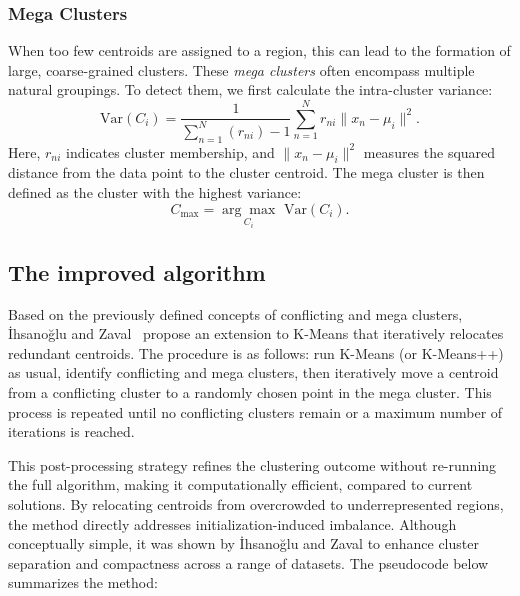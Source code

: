 \documentclass[10pt,twocolumn,letterpaper]{article}
\begin{document}
\subsubsection{Mega Clusters}

When too few centroids are assigned to a region, this can lead to the formation
of large, coarse-grained clusters. These \textit{mega clusters} often encompass
multiple natural groupings. To detect them, we first calculate the
intra-cluster variance:
\begin{equation}
    \label{eq:cluster-var}
    \text{Var}(C_i) = \frac{1}{\sum_{n=1}^{N} (r_{ni}) - 1} \sum_{n=1}^{N} r_{ni} \|x_n - \mu_i\|^2.
\end{equation}
Here, $r_{ni}$ indicates cluster membership, and $\|x_n - \mu_i\|^2$ measures
the squared distance from the data point to the cluster centroid. The mega
cluster is then defined as the cluster with the highest variance:
\begin{equation}
    \label{eq:mega-cluster}
    C_{\max} = \underset{C_i}{\arg\max}\text{ Var}(C_i).
\end{equation}


\subsection{The improved algorithm}\label{subsec:the-improved-algorithm}

Based on the previously defined concepts of conflicting and mega clusters,
İhsanoğlu and Zaval~\cite{Abdullah10601123} propose an extension to K-Means
that iteratively relocates redundant centroids. The procedure is as follows:
run K-Means (or K-Means++) as usual, identify conflicting and mega clusters,
then iteratively move a centroid from a conflicting cluster to a randomly
chosen point in the mega cluster. This process is repeated until no conflicting
clusters remain or a maximum number of iterations is reached.

This post-processing strategy refines the clustering outcome without re-running
the full algorithm, making it computationally efficient, compared to current
solutions. By relocating centroids from overcrowded to underrepresented
regions, the method directly addresses initialization-induced imbalance.
Although conceptually simple, it was shown by İhsanoğlu and Zaval to enhance
cluster separation and compactness across a range of datasets. The pseudocode
below summarizes the method:
\end{document}
